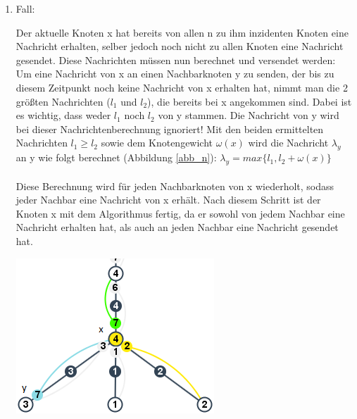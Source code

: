 \begin{enumerate}
		
	\item Fall:
	
		Der aktuelle Knoten x hat bereits von allen n zu ihm inzidenten Knoten eine Nachricht erhalten, selber jedoch noch nicht zu allen Knoten eine Nachricht gesendet. Diese Nachrichten müssen nun berechnet und versendet werden:\label{labelAufUnterfall}
		\\
		
		
		Um eine Nachricht von x an einen Nachbarknoten y zu senden, der bis zu diesem Zeitpunkt noch keine Nachricht von x erhalten hat, nimmt man die 2 größten Nachrichten ($l_{1}$ und $l_{2}$), die bereits bei x angekommen sind. Dabei ist es wichtig, dass weder $l_{1}$ noch $l_{2}$ von y stammen. Die Nachricht von y wird bei dieser Nachrichtenberechnung ignoriert! Mit den beiden ermittelten Nachrichten $l_{1} \ge l_{2}$ sowie dem Knotengewicht $\omega(x)$ wird die Nachricht $\lambda_{y}$ an y wie folgt berechnet (Abbildung \ref{abb_n}):  $\lambda_{y} = max\{l_{1},  l_{2} + \omega(x)\}$
		\\
		\\
		Diese Berechnung wird für jeden Nachbarknoten von x wiederholt, sodass jeder Nachbar eine Nachricht von x erhält. Nach diesem Schritt ist der Knoten x mit dem Algorithmus fertig, da er sowohl von jedem Nachbar eine Nachricht erhalten hat, als auch an jeden Nachbar eine Nachricht gesendet hat.
		
		\includegraphics[width=\textwidth]{bilder/abb_paper_nknoten.png}
		\label{abb_n}
	
		
		
\end{enumerate}



